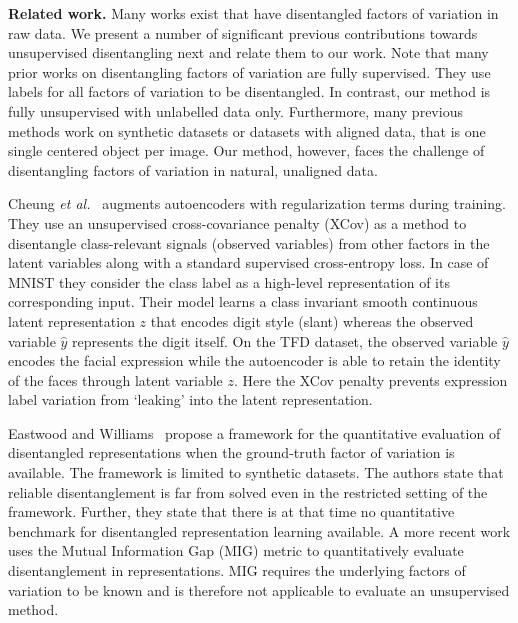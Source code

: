 \documentclass[12pt,a4paper]{article}
\begin{document}
\par \textbf{Related work.} Many works exist that have disentangled factors of variation in raw data. We present a number of significant previous contributions towards unsupervised disentangling next and relate them to our work. Note that many prior works on disentangling factors of variation are fully supervised. They use labels for all factors of variation to be disentangled. In contrast, our method is fully unsupervised with unlabelled data only. Furthermore, many previous methods work on synthetic datasets or datasets with aligned data, that is one single centered object per image. Our method, however, faces the challenge of disentangling factors of variation in natural, unaligned data.


\par Cheung \textit{et al.}~\cite{DiscHiddenFoViDN} augments autoencoders with regularization terms during training. They use an unsupervised cross-covariance penalty (XCov) as a method to disentangle class-relevant signals (observed variables) from other factors in the latent variables along with a standard supervised cross-entropy loss. In case of MNIST they consider the class label as a high-level representation of its corresponding input. Their model learns a class invariant smooth continuous latent representation $z$ that encodes digit style (slant) whereas the observed variable $\hat{y}$ represents the digit itself. On the TFD dataset, the observed variable $\hat{y}$ encodes the facial expression while the autoencoder is able to retain the identity of the faces through latent variable $z$. Here the XCov penalty prevents expression label variation from ‘leaking’ into the latent representation.

\par Eastwood and Williams~\cite{FwkQuantEvalDisRep} propose a framework for the quantitative evaluation of disentangled representations when the ground-truth factor of variation is available. The framework is limited to synthetic datasets. The authors state that reliable disentanglement is far from solved even in the restricted setting of the framework. Further, they state that there is at that time no quantitative benchmark for disentangled representation learning available. A more recent work \cite{SpatialBDecoder} uses the Mutual Information Gap (MIG) metric to quantitatively evaluate disentanglement in representations. MIG requires the underlying factors of variation to be known and is therefore not applicable to evaluate an unsupervised method.
\end{document}
